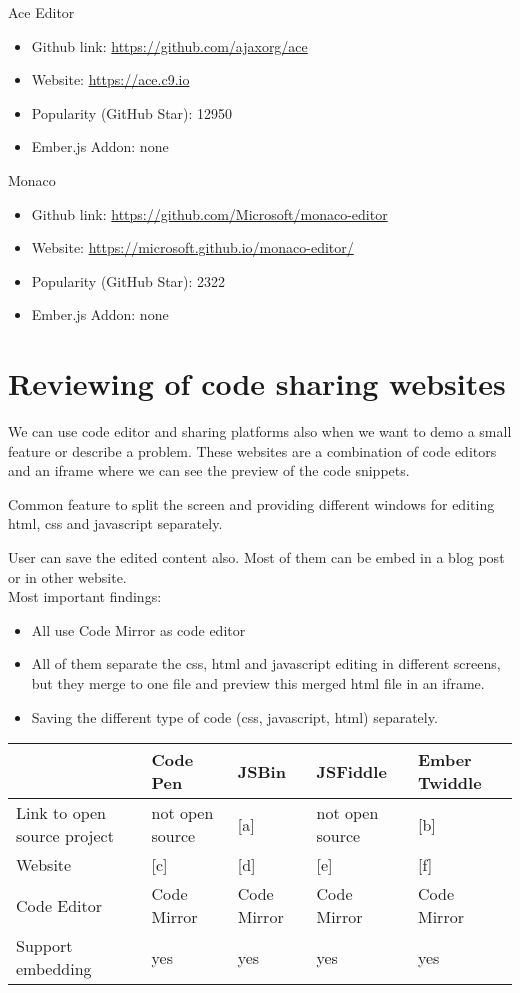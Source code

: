 \documentclass[11pt, a4paper, twoside, openright]{report}
\begin{document}
\noindent Ace Editor
\begin{itemize}[noitemsep]
\item Github link: \url{https://github.com/ajaxorg/ace}
\item Website: \url{https://ace.c9.io}
\item Popularity (GitHub Star): 12950
\item Ember.js Addon: none
\end{itemize}

\noindent Monaco
\begin{itemize}[noitemsep]
\item Github link: \url{https://github.com/Microsoft/monaco-editor}
\item Website: \url{https://microsoft.github.io/monaco-editor/}
\item Popularity (GitHub Star): 2322
\item Ember.js Addon: none
\end{itemize}

\section{Reviewing of code sharing websites}

We can use code editor and sharing platforms also when we want to demo a small feature or describe a problem. These websites are a combination of code editors and an iframe where we can see the preview of the code snippets.

Common feature to split the screen and providing different windows for editing html, css and javascript separately.

User can save the edited content also. Most of them can be embed in a blog post or in other website. \\

\noindent Most important findings:
\begin{itemize}[noitemsep]
\item All use Code Mirror as code editor
\item All of them separate the css, html and javascript editing in different screens, but they merge to one file and preview this merged html file in an iframe.
\item Saving the different type of code (css, javascript, html) separately.
\end{itemize}

\newpage

\begin{tabular}{|l|l|l|l|l|}
\hline
& Code Pen & JSBin & JSFiddle & Ember Twiddle \\
\hline
Link to open source project & not open source & [a] & not open source & [b]  \\
\hline
Website & [c] & [d] & [e] & [f] \\
\hline
Code Editor & Code Mirror & Code Mirror & Code Mirror & Code Mirror \\
\hline
Support embedding & yes & yes & yes & yes \\
\hline
\end{tabular}\\
\end{document}
